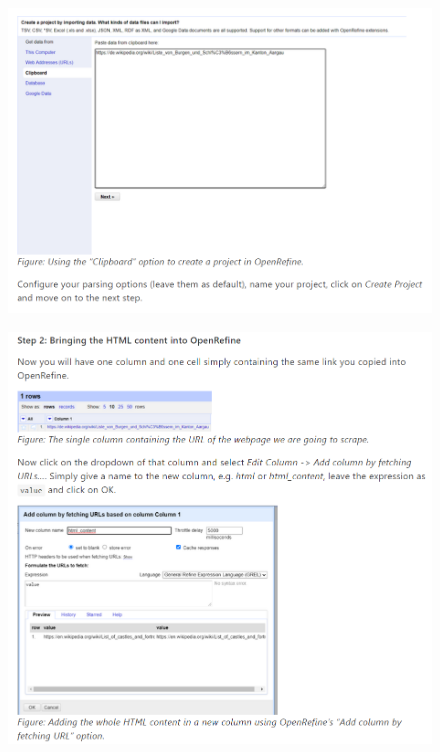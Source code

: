 \begin{figure}[H]
    \includegraphics[width=\linewidth]{./Figures/Appendices/worksheet/52.png}
\end{figure}
\begin{figure}[H]
    \includegraphics[width=\linewidth]{./Figures/Appendices/worksheet/53.png}
\end{figure}

